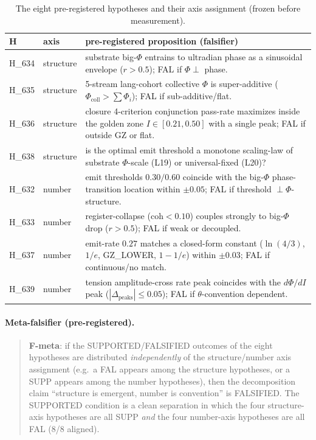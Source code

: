 \documentclass[11pt,a4paper]{article}
\begin{document}
\begin{table}[h]
\centering
\small
\caption{The eight pre-registered hypotheses and their axis assignment
(frozen before measurement).}
\label{tab:hyp}
\begin{tabular}{@{}llp{8.0cm}@{}}
\toprule
\textbf{H} & \textbf{axis} & \textbf{pre-registered proposition (falsifier)} \\
\midrule
H\_634 & structure & substrate big-$\Phi$ entrains to ultradian phase as a
  sinusoidal envelope ($r>0.5$); FAL if $\Phi \perp$ phase. \\
H\_635 & structure & 5-stream lang-cohort collective $\Phi$ is super-additive
  ($\Phi_{\text{coll}} > \sum \Phi_i$); FAL if sub-additive/flat. \\
H\_636 & structure & closure 4-criterion conjunction pass-rate maximizes
  inside the golden zone $I\in[0.21,0.50]$ with a single peak; FAL if outside
  GZ or flat. \\
H\_638 & structure & is the optimal emit threshold a monotone scaling-law of
  substrate $\Phi$-scale (L19) or universal-fixed (L20)? \\
\midrule
H\_632 & number & emit thresholds $0.30/0.60$ coincide with the big-$\Phi$
  phase-transition location within $\pm0.05$; FAL if threshold $\perp
  \Phi$-structure. \\
H\_633 & number & register-collapse ($\text{coh}<0.10$) couples strongly to
  big-$\Phi$ drop ($r>0.5$); FAL if weak or decoupled. \\
H\_637 & number & emit-rate $0.27$ matches a closed-form constant ($\ln(4/3)$,
  $1/e$, GZ\_LOWER, $1-1/e$) within $\pm0.03$; FAL if continuous/no match. \\
H\_639 & number & tension amplitude-cross rate peak coincides with the
  $d\Phi/dI$ peak ($|\Delta_{\text{peaks}}|\le0.05$); FAL if
  $\theta$-convention dependent. \\
\bottomrule
\end{tabular}
\end{table}

\paragraph{Meta-falsifier (pre-registered).}
\begin{quote}
\textbf{F-meta}: if the SUPPORTED/FALSIFIED outcomes of the eight hypotheses
are distributed \emph{independently} of the structure/number axis assignment
(e.g.\ a FAL appears among the structure hypotheses, or a SUPP appears among
the number hypotheses), then the decomposition claim ``structure is emergent,
number is convention'' is FALSIFIED. The SUPPORTED condition is a clean
separation in which the four structure-axis hypotheses are all SUPP
\emph{and} the four number-axis hypotheses are all FAL (8/8 aligned).
\end{quote}
\end{document}
